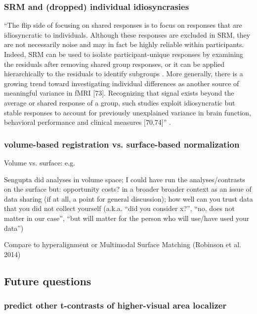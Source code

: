 {\subsubsection{SRM and (dropped) individual idiosyncrasies}

``The flip side of focusing on shared responses is to focus on responses that
are idiosyncratic to individuals.
%
Although these responses are excluded in SRM, they are not necessarily noise and
may in fact be highly reliable within participants.
%
Indeed, SRM can be used to isolate participant-unique responses by examining the
residuals after removing shared group responses, or it can be applied
hierarchically to the residuals to identify subgroups \citep{chen2017shared}
\citep{cohen2017computational}.
%
More generally, there is a growing trend toward investigating individual
differences as another source of meaningful variance in fMRI [73].
%
Recognizing that signal exists beyond the average or shared response of a group,
such studies exploit idiosyncratic but stable responses to account for
previously unexplained variance in brain function, behavioral performance and
clinical measures [70,74]'' \citep{cohen2017computational}.


\subsubsection{volume-based registration vs. surface-based normalization}
%
Volume vs. surface: e.g. \citep{desai2005volumetric}

Sengupta did analyses in volume space;
%
I could have run the analyses/contrasts on the surface
%
but: opportunity costs?
%
in a broader broader context as an issue of data sharing (if at all, a point for
general discussion); how well can you trust data that you did not collect
yourself (a.k.a. ``did you consider x?'', ``no, does not matter in our case'',
``but will matter for the person who will use/have used your data'')

Compare to hyperalignment or Multimodal Surface Matching (Robinson et al. 2014)


\subsection{Future questions}

\subsubsection{predict other t-contrasts of higher-visual area localizer}

}
